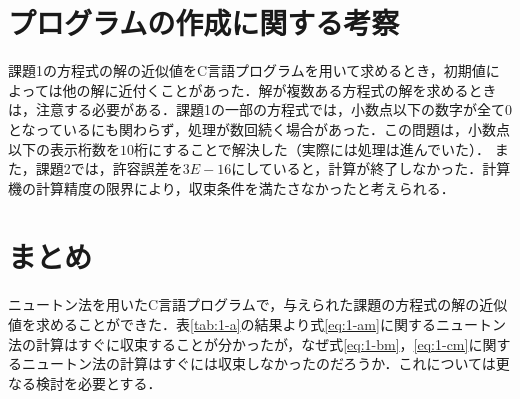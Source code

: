 \documentclass[12pt]{jarticle}
\renewcommand  \[  {\begin{eqnarray}}
\renewcommand  \]  {\end{eqnarray}}
\begin{document}
\section{プログラムの作成に関する考察}
課題1の方程式の解の近似値をC言語プログラムを用いて求めるとき，初期値によっては他の解に近付くことがあった．解が複数ある方程式の解を求めるときは，注意する必要がある．課題1の一部の方程式では，小数点以下の数字が全て$0$となっているにも関わらず，処理が数回続く場合があった．この問題は，小数点以下の表示桁数を$10$桁にすることで解決した（実際には処理は進んでいた）．
また，課題2では，許容誤差を$3E-16$にしていると，計算が終了しなかった．計算機の計算精度の限界により，収束条件を満たさなかったと考えられる．
\section{まとめ}
ニュートン法を用いたC言語プログラムで，与えられた課題の方程式の解の近似値を求めることができた．表\ref{tab:1-a}の結果より式\ref{eq:1-am}に関するニュートン法の計算はすぐに収束することが分かったが，なぜ式\ref{eq:1-bm}，\ref{eq:1-cm}に関するニュートン法の計算はすぐには収束しなかったのだろうか．これについては更なる検討を必要とする．
\end{document}
